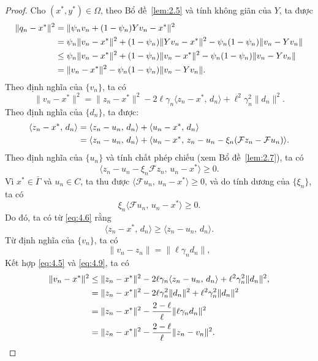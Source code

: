 \documentclass{MyBook}
\theoremstyle{plain}
\theoremstyle{definition}
\theoremstyle{remark}
\numberwithin{equation}{chapter}
\newcommand{\Fc}{\mathcal{F}}
\newcommand{\inp}[2]{\langle #1,\,#2\rangle}
\newcommand{\nm}[1]{\lVert #1\rVert}
\newcommand{\Gam}{\bar{\Gamma}}
\begin{document}
\begin{proof}
Cho $(x^{*},y^{*})\in\Omega$, theo Bổ đề~\ref{lem:2.5} và tính không giãn của $Y$, ta được
\begin{align}
\nm{q_n-x^{*}}^2 &= \nm{\psi_n v_n+(1-\psi_n)Yv_n-x^{*}}^2\notag\\
&= \psi_n\nm{v_n-x^{*}}^2+(1-\psi_n)\nm{Yv_n-x^{*}}^2-\psi_n(1-\psi_n)\nm{v_n-Yv_n}\notag\\
&\le \psi_n\nm{v_n-x^{*}}^2+(1-\psi_n)\nm{v_n-x^{*}}^2-\psi_n(1-\psi_n)\nm{v_n-Yv_n}\notag\\
&= \nm{v_n-x^{*}}^2-\psi_n(1-\psi_n)\nm{v_n-Yv_n}. \label{eq:4.4}
\end{align}
Theo định nghĩa của $\{v_n\}$, ta có
\begin{equation}
\nm{v_n-x^{*}}^2=\nm{z_n-x^{*}}^2-2\ell\gamma_n\inp{z_n-x^{*}}{d_n}+\ell^2\gamma_n^2\nm{d_n}^2. \label{eq:4.5}
\end{equation}
Theo định nghĩa của $\{d_n\}$, ta được:
\begin{align}
\inp{z_n-x^{*}}{d_n} &= \inp{z_n-u_n}{d_n}+\inp{u_n-x^{*}}{d_n}\notag\\
&= \inp{z_n-u_n}{d_n}+\inp{u_n-x^{*}}{z_n-u_n-\xi_n(\Fc z_n-\Fc u_n)}. \label{eq:4.6}
\end{align}
Theo định nghĩa của $\{u_n\}$ và tính chất phép chiếu (xem Bổ đề~\ref{lem:2.7}), ta có
\begin{equation}
\inp{z_n-u_n-\xi_n\Fc z_n}{u_n-x^{*}}\ge 0. \label{eq:4.7}
\end{equation}
Vì $x^{*}\in\Gam$ và $u_n\in C$, ta thu được $\inp{\Fc u_n}{u_n-x^{*}}\ge 0$, và do tính dương của $\{\xi_n\}$, ta có
\begin{equation}
\xi_n\inp{\Fc u_n}{u_n-x^{*}}\ge 0. \label{eq:4.8}
\end{equation}
Do đó, ta có từ \eqref{eq:4.6} rằng
\begin{equation}
\inp{z_n-x^{*}}{d_n}\ge\inp{z_n-u_n}{d_n}. \label{eq:4.9}
\end{equation}
Từ định nghĩa của $\{v_n\}$, ta có
\[
\nm{v_n-z_n}=\nm{\ell\gamma_n d_n},
\]
Kết hợp \eqref{eq:4.5} và \eqref{eq:4.9}, ta có
\begin{align}
\nm{v_n-x^{*}}^2 &\le \nm{z_n-x^{*}}^2-2\ell\gamma_n\inp{z_n-u_n}{d_n}+\ell^2\gamma_n^2\nm{d_n}^2,\notag\\
&= \nm{z_n-x^{*}}^2-2\ell\gamma_n^2\nm{d_n}^2+\ell^2\gamma_n^2\nm{d_n}^2\notag\\
&= \nm{z_n-x^{*}}^2-\frac{2-\ell}{\ell}\nm{\ell\gamma_n d_n}^2\notag\\
&= \nm{z_n-x^{*}}^2-\frac{2-\ell}{\ell}\nm{z_n-v_n}^2. \label{eq:4.10}

\end{align}
\end{proof}
\end{document}
